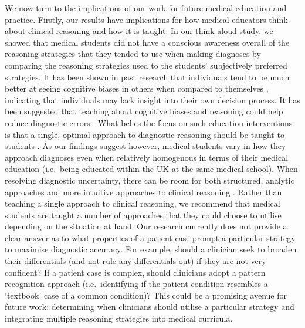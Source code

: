 \documentclass[a4paper, nobind]{templates/ociamthesis}
\begin{document}
We now turn to the implications of our work for future medical education and practice. Firstly, our results have implications for how medical educators think about clinical reasoning and how it is taught. In our think-aloud study, we showed that medical students did not have a conscious awareness overall of the reasoning strategies that they tended to use when making diagnoses by comparing the reasoning strategies used to the students' subjectively preferred strategies. It has been shown in past research that individuals tend to be much better at seeing cognitive biases in others when compared to themselves \autocite{pronin_bias_2002}, indicating that individuals may lack insight into their own decision process. It has been suggested that teaching about cognitive biases and reasoning could help reduce diagnostic errors \autocite{royce_teaching_2019}. What belies the focus on such education interventions is that a single, optimal approach to diagnostic reasoning should be taught to students \autocite{kassirer_teaching_1983}. As our findings suggest however, medical students vary in how they approach diagnoses even when relatively homogenous in terms of their medical education (i.e.~being educated within the UK at the same medical school). When resolving diagnostic uncertainty, there can be room for both structured, analytic approaches and more intuitive approaches to clinical reasoning \autocite{custers_medical_2013}. Rather than teaching a single approach to clinical reasoning, we recommend that medical students are taught a number of approaches that they could choose to utilise depending on the situation at hand. Our research currently does not provide a clear answer as to what properties of a patient case prompt a particular strategy to maximise diagnostic accuracy. For example, should a clinician seek to broaden their differentials (and not rule any differentials out) if they are not very confident? If a patient case is complex, should clinicians adopt a pattern recognition approach (i.e.~identifying if the patient condition resembles a `textbook' case of a common condition)? This could be a promising avenue for future work: determining when clinicians should utilise a particular strategy and integrating multiple reasoning strategies into medical curricula.
\end{document}
